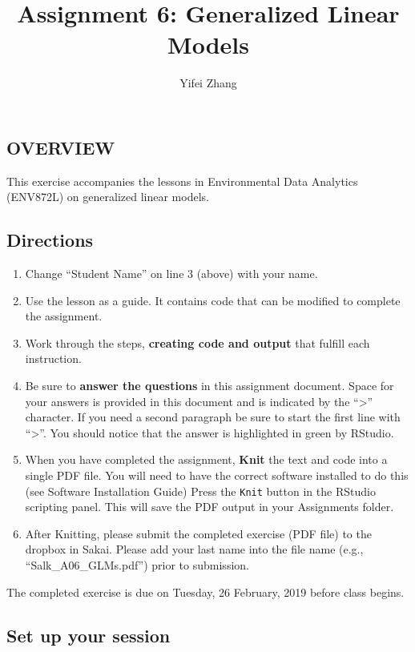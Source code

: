 \documentclass[]{article}
\title{Assignment 6: Generalized Linear Models}
\author{Yifei Zhang}
\date{}
\providecommand{\tightlist}{%
  \setlength{\itemsep}{0pt}\setlength{\parskip}{0pt}}
\begin{document}
\maketitle

\subsection{OVERVIEW}\label{overview}

This exercise accompanies the lessons in Environmental Data Analytics
(ENV872L) on generalized linear models.

\subsection{Directions}\label{directions}

\begin{enumerate}
\def\labelenumi{\arabic{enumi}.}
\tightlist
\item
  Change ``Student Name'' on line 3 (above) with your name.
\item
  Use the lesson as a guide. It contains code that can be modified to
  complete the assignment.
\item
  Work through the steps, \textbf{creating code and output} that fulfill
  each instruction.
\item
  Be sure to \textbf{answer the questions} in this assignment document.
  Space for your answers is provided in this document and is indicated
  by the ``\textgreater{}'' character. If you need a second paragraph be
  sure to start the first line with ``\textgreater{}''. You should
  notice that the answer is highlighted in green by RStudio.
\item
  When you have completed the assignment, \textbf{Knit} the text and
  code into a single PDF file. You will need to have the correct
  software installed to do this (see Software Installation Guide) Press
  the \texttt{Knit} button in the RStudio scripting panel. This will
  save the PDF output in your Assignments folder.
\item
  After Knitting, please submit the completed exercise (PDF file) to the
  dropbox in Sakai. Please add your last name into the file name (e.g.,
  ``Salk\_A06\_GLMs.pdf'') prior to submission.
\end{enumerate}

The completed exercise is due on Tuesday, 26 February, 2019 before class
begins.

\subsection{Set up your session}\label{set-up-your-session}
\end{document}
